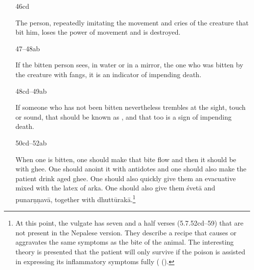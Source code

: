 \begin{translation}
\begin{itemize}
{The main interpreters state that it is the limb or the location of
the bite that becomes numb, not that the person loses consciousness.
It is tempting to think that a more original text might have been
referring to the victim losing consciousness.
[375]{srik-1991} took this view (against the commentator
Aruṇadatta): “\ldots\ the person gets into stupor \ldots ."}

And it is in the main marked by the signs of someone who has been
pierced by a poisoned arrow.\footnote{ “marked by”
    is not a common word and is perhaps a hapax legomenon.  The vulgate
    has the simpler expression .}

\item[46cd]

The person, repeatedly imitating the movement and cries of the creature that 
bit him, loses the power of movement and is destroyed. 

\item [47--48ab]

If the bitten person sees, in water or in a mirror, the one who was bitten by 
the creature with fangs, it is an indicator of impending death.

\item [48cd--49ab]

If someone who has not been bitten nevertheless trembles at the sight, touch 
or sound, that should be known as , and that too 
is a sign of impending death.

\item[50cd--52ab]
        
When one is bitten, one should make that bite flow and then it should
be  with ghee.  One should anoint it with
antidotes and one should also make the patient
drink aged ghee.  One should also quickly give them an evacuative
mixed with the latex of \gls{arka}.  One should also give them
\gls{śvetā} and \gls{punarṇṇavā}, together with
\gls{dhuttūrakā}.\footnote{At this point, the vulgate has seven and a
    half verses (5.7.52cd--59) that are not present in the Nepalese
    version.  They describe a recipe that causes or aggravates the same
    symptoms as the bite of the animal. The interesting theory is
    presented that the patient will only survive if the poison is
    assisted in expressing its inflammatory symptoms fully
    (
    ().}


\end{itemize}
\end{translation}
